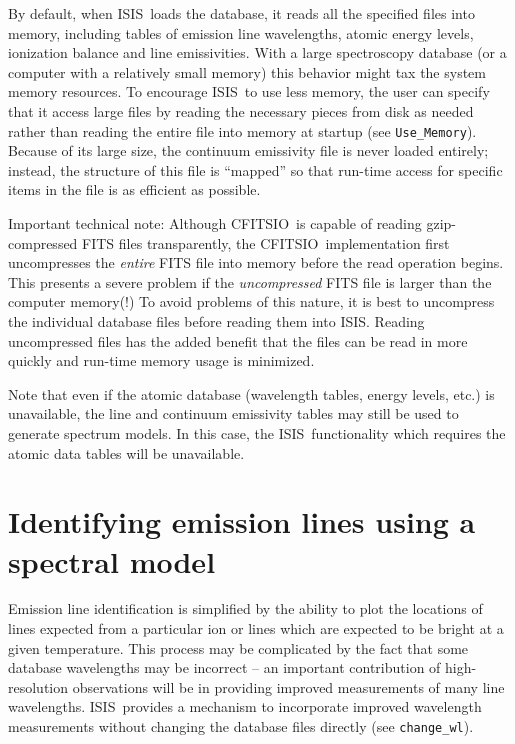 \documentclass{book}
\newcommand{\isisx}{{\sc ISIS~}}
\newcommand{\isis}{{\sc ISIS}}
\newcommand{\cfitsio}{{\sc CFITSIO}}
\begin{document}
By default, when \isisx loads the database, it reads all the specified files
into memory, including tables of emission line wavelengths, atomic energy
levels, ionization balance and line emissivities.  With a large
spectroscopy database (or a computer with a relatively small memory) this
behavior might tax the system memory resources. To encourage \isisx to use
less memory, the user can specify that it access large files by reading the
necessary pieces from disk as needed rather than reading the entire file
into memory at startup (see \verb|Use_Memory|).  Because of its large size,
the continuum emissivity file is never loaded entirely; instead, the
structure of this file is ``mapped'' so that run-time access for specific
items in the file is as efficient as possible.

Important technical note: Although \cfitsio\ is capable of reading
gzip-compressed FITS files transparently, the \cfitsio\ implementation first
uncompresses the {\it entire} FITS file into memory before the read operation
begins. This presents a severe problem if the {\it uncompressed} FITS file is
larger than the computer memory(!) To avoid problems of this nature, it is
best to uncompress the individual database files before reading them into
\isis. Reading uncompressed files has the added benefit that the files can
be read in more quickly and run-time memory usage is minimized.

Note that even if the atomic database (wavelength tables, energy levels,
etc.) is unavailable, the line and continuum emissivity tables may still be
used to generate spectrum models.  In this case, the \isisx functionality
which requires the atomic data tables will be unavailable.

\section{Identifying emission lines using a spectral model}

Emission line identification is simplified by the ability to plot the
locations of lines expected from a particular ion or lines which are
expected to be bright at a given temperature.  This process may be
complicated by the fact that some database wavelengths may be incorrect --
an important contribution of high-resolution observations will be in
providing improved measurements of many line wavelengths.  \isisx provides a
mechanism to incorporate improved wavelength measurements without changing
the database files directly (see {\tt change\_wl}).
\end{document}
